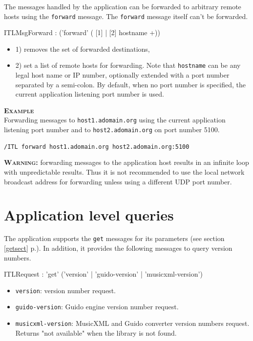 \documentclass[a4paper,twoside]{report}
\newcommand{\sublevel}[1]	{\section{#1}}
\newcommand{\fullref}[1]	{\ref{#1} p.\pageref{#1}}
\newcommand{\OSC}[1]		{\texttt{#1}}
\newcommand{\example}		{\textbf{\hspace{-1.5cm}\textbf{\textsc{Example }}}}
\newcommand{\sample}	[1]			{\vspace{-2mm}\begin{center}\colorbox{mygrey}{
								\begin{minipage}[t]{0.9\columnwidth} 
								{\small \texttt{#1}}
								\end{minipage}}\end{center}}
\newcommand{\warning}[1]	{\textbf{\textsc{Warning:}} #1}
\begin{document}
The messages handled by the application can be forwarded to arbitrary remote hosts using the \OSC{forward} message. The \OSC{forward} message itself can't be forwarded. 
 
\begin{rail}
ITLMsgForward : ('forward' ( [1] | [2] hostname +))
\end{rail}

\begin{itemize}

\item 1) removes the set of forwarded destinations,
\item 2) set a list of remote hosts for forwarding. Note that \OSC{hostname} can be any legal host name or IP number, optionally extended with a port number separated by a semi-colon. By default, when no port number is specified, the current application listening port number is used.
\end{itemize}
\example\\
Forwarding messages to \OSC{host1.adomain.org} using the current application listening port number
and to \OSC{host2.adomain.org} on port number 5100.

\sample{/ITL forward host1.adomain.org host2.adomain.org:5100}

\warning{forwarding messages to the application host results in an infinite loop with unpredictable results. Thus it is not recommended to use the local network broadcast address for forwarding unless using a different UDP port number.}



\sublevel{Application level queries}
\label{ITLQuery}

The application supports the \OSC{get} messages for its parameters (see section \fullref{getsect}). In addition, it provides the following messages to query version numbers.

\begin{rail}
ITLRequest : 'get'  ('version' | 'guido-version' | 'musicxml-version')
\end{rail}

\begin{itemize}
\item \OSC{version}: version number request.
\item \OSC{guido-version}: Guido engine version number request.
\item \OSC{musicxml-version}: MusicXML and Guido converter version numbers request. Returns "not available" when the library is not found.

\end{itemize}
\end{document}
